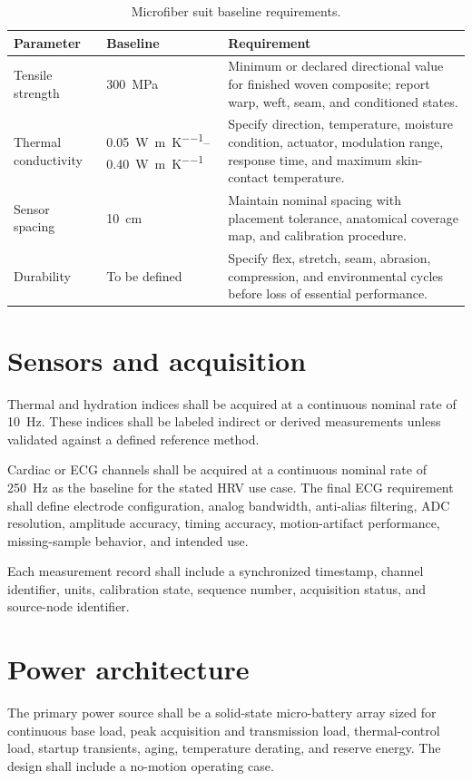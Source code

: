 \documentclass[11pt,a4paper]{article}
\begin{document}
\begin{table}[H]
\centering
\caption{Microfiber suit baseline requirements.}
\label{tab:suit}
\begin{tabularx}{\textwidth}{p{}p{}X}
\toprule
\textbf{Parameter} & \textbf{Baseline} & \textbf{Requirement}\\
\midrule
Tensile strength & \SI{300}{\mega\pascal} & Minimum or declared directional value for finished woven composite; report warp, weft, seam, and conditioned states.\\
Thermal conductivity & \SIrange{0.05}{0.40}{\watt\per\meter\per\kelvin} & Specify direction, temperature, moisture condition, actuator, modulation range, response time, and maximum skin-contact temperature.\\
Sensor spacing & \SI{10}{\centi\meter} & Maintain nominal spacing with placement tolerance, anatomical coverage map, and calibration procedure.\\
Durability & To be defined & Specify flex, stretch, seam, abrasion, compression, and environmental cycles before loss of essential performance.\\
\bottomrule
\end{tabularx}
\end{table}

\section{Sensors and acquisition}\label{sec:sensors}
Thermal and hydration indices shall be acquired at a continuous nominal rate of \SI{10}{\hertz}. These indices shall be labeled indirect or derived measurements unless validated against a defined reference method.

Cardiac or ECG channels shall be acquired at a continuous nominal rate of \SI{250}{\hertz} as the baseline for the stated HRV use case. The final ECG requirement shall define electrode configuration, analog bandwidth, anti-alias filtering, ADC resolution, amplitude accuracy, timing accuracy, motion-artifact performance, missing-sample behavior, and intended use.

Each measurement record shall include a synchronized timestamp, channel identifier, units, calibration state, sequence number, acquisition status, and source-node identifier.

\section{Power architecture}\label{sec:power}
The primary power source shall be a solid-state micro-battery array sized for continuous base load, peak acquisition and transmission load, thermal-control load, startup transients, aging, temperature derating, and reserve energy. The design shall include a no-motion operating case.
\end{document}

